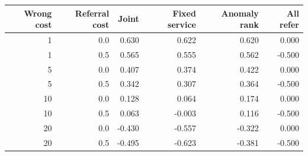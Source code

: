 \begin{tabular*}{\linewidth}{@{\extracolsep{\fill}}rrrrrr@{}}
\toprule
Wrong cost & Referral cost & Joint & Fixed service & Anomaly rank & All refer \\
\midrule
1 & 0.0 & 0.630 & 0.622 & 0.620 & 0.000 \\
1 & 0.5 & 0.565 & 0.555 & 0.562 & -0.500 \\
5 & 0.0 & 0.407 & 0.374 & 0.422 & 0.000 \\
5 & 0.5 & 0.342 & 0.307 & 0.364 & -0.500 \\
10 & 0.0 & 0.128 & 0.064 & 0.174 & 0.000 \\
10 & 0.5 & 0.063 & -0.003 & 0.116 & -0.500 \\
20 & 0.0 & -0.430 & -0.557 & -0.322 & 0.000 \\
20 & 0.5 & -0.495 & -0.623 & -0.381 & -0.500 \\
\bottomrule
\end{tabular*}
